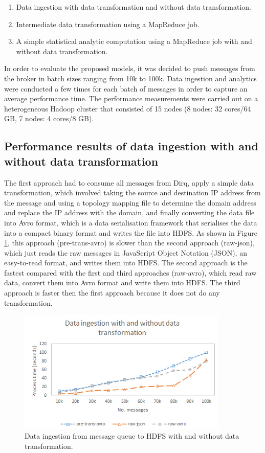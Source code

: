 \begin{enumerate}[1.]
\item Data ingestion with data transformation and without data transformation.
\item Intermediate data transformation using a MapReduce job.
\item A simple statistical analytic computation using a MapReduce job with and without data transformation.
\end{enumerate}

In order to evaluate the proposed models, it was decided to push messages from the broker in batch sizes ranging from 10k to 100k. Data ingestion and analytics were conducted a few times for each batch of messages in order to capture an average performance time. The performance measurements were carried out on a heterogeneous Hadoop cluster that consisted of 15 nodes (8 nodes: 32 cores/64 GB, 7 nodes: 4 cores/8 GB).


\subsection{Performance results of data ingestion with and without data transformation} \label{lbl-perf-dpipe}
The first approach had to consume all messages from Dirq, apply a simple data transformation, which involved taking the source and destination IP address from the message and using a topology mapping file to determine the domain address and replace the IP address with the domain, and finally converting the data file into Avro format, which is a data serialisation framework that serialises the data into a compact binary format and writes the file into HDFS. As shown in Figure \ref{fig:pipe}, this approach (pre-trans-avro) is slower than the second approach (raw-json), which just reads the raw messages in JavaScript Object Notation (JSON), an easy-to-read format, and writes them into HDFS. The second approach is the fastest compared with the first and third approaches (raw-avro), which read raw data, convert them into Avro format and write them into HDFS. The third approach is faster then the first approach because it does not do any transformation.

\begin{figure}[H]
  \centering
  \includegraphics[width=100mm]{./Figures/datapipe_perf.jpg}
  \caption{\small Data ingestion from message queue to HDFS with and without data transformation.}\label{fig:pipe}
\end{figure}



